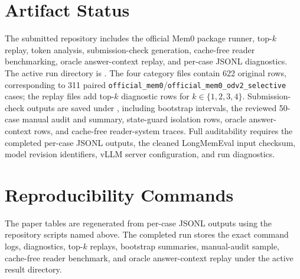 \documentclass{article}
\begin{document}
\section*{Artifact Status}

The submitted repository includes the official Mem0 package runner, top-$k$ replay, token analysis, submission-check generation, cache-free reader benchmarking, oracle answer-context replay, and per-case JSONL diagnostics. The active run directory is . The four category files contain 622 original rows, corresponding to 311 paired \texttt{official\_mem0}/\texttt{official\_mem0\_odv2\_selective} cases; the replay files add top-$k$ diagnostic rows for $k \in \{1,2,3,4\}$. Submission-check outputs are saved under , including bootstrap intervals, the reviewed 50-case manual audit and summary, state-guard isolation rows, oracle answer-context rows, and cache-free reader-system traces. Full auditability requires the completed per-case JSONL outputs, the cleaned LongMemEval input checksum, model revision identifiers, vLLM server configuration, and run diagnostics.

\section*{Reproducibility Commands}

The paper tables are regenerated from per-case JSONL outputs using the repository scripts named above. The completed run stores the exact command logs, diagnostics, top-$k$ replays, bootstrap summaries, manual-audit sample, cache-free reader benchmark, and oracle answer-context replay under the active result directory.

\FloatBarrier


\end{document}
